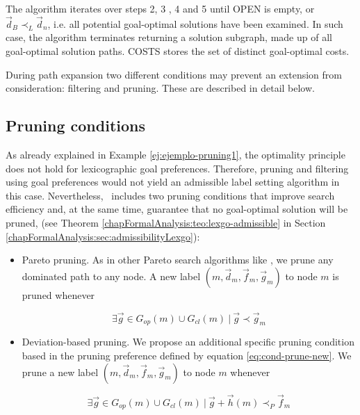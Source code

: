 The algorithm iterates over steps 2, 3 , 4 and 5 until OPEN is empty, or $\vec{d}_B \prec_{L} \vec{d}_n$, i.e. all potential goal-optimal solutions have been examined. In such case, the algorithm terminates returning a solution subgraph, made up of all goal-optimal solution paths. COSTS stores the set of distinct goal-optimal costs.
 
During path expansion two different conditions may prevent an extension from consideration: filtering and pruning. These are described in detail below. 

\subsection{Pruning conditions}
\label{subsubsec:Pruning-conditions}

As already explained in Example \ref{ej:ejemplo-pruning1}, the optimality principle does not hold for lexicographic goal preferences. Therefore, pruning and filtering using goal preferences would not yield an admissible label setting algorithm in this case. 
Nevertheless, \lexgo \ includes two pruning conditions that improve search efficiency and, at the same time, guarantee that no goal-optimal solution will be pruned, (see Theorem \ref{chapFormalAnalysis:teo:lexgo-admissible} in Section \ref{chapFormalAnalysis:sec:admissibilityLexgo}):

\begin{itemize}

  \item 
Pareto pruning. As in other Pareto search algorithms like \namoa, we prune any dominated path to any node. A new label $(m, \vec d_m, \vec f_m, \vec g_m)$ to node $m$ is pruned whenever

    \begin{equation}\label{eq:cond-prune-dom}
      \exists \vec g \in G_{op}(m) \cup G_{cl}(m) \ | \ \vec g \prec \vec g_m 
    \end{equation}
    
  \item 
Deviation-based pruning. We propose an additional specific pruning condition based in the pruning preference defined by equation \ref{eq:cond-prune-new}. We prune a new label $(m, \vec d_m, \vec f_m, \vec g_m)$ to node $m$ whenever

\begin{equation}\label{eq:cond-prune-deviation}
\exists \vec g \in G_{op}(m) \cup G_{cl}(m) \ | \ \vec g + \vec h(m)\prec_P \vec f_m   
\end{equation}
\end{itemize}


